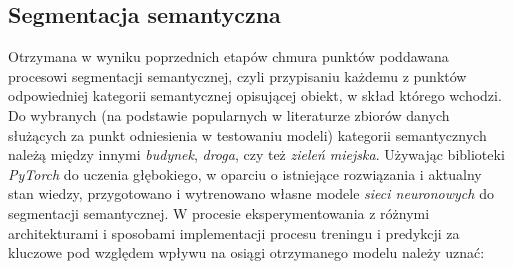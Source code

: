 \subsection{Segmentacja semantyczna}
Otrzymana w wyniku poprzednich etapów chmura punktów poddawana procesowi segmentacji semantycznej, czyli przypisaniu każdemu z punktów odpowiedniej kategorii semantycznej opisującej obiekt, w skład którego wchodzi. Do wybranych (na podstawie popularnych w literaturze zbiorów danych służących za punkt odniesienia w testowaniu modeli) kategorii semantycznych należą między innymi \textit{budynek}, \textit{droga}, czy też \textit{zieleń miejska}. 
Używając biblioteki \textit{PyTorch} do uczenia głębokiego, w oparciu o istniejące rozwiązania i aktualny stan wiedzy, przygotowano i wytrenowano własne modele \emph{sieci neuronowych} do segmentacji semantycznej.
W procesie eksperymentowania z różnymi architekturami i sposobami implementacji procesu treningu i predykcji za kluczowe pod względem wpływu na osiągi otrzymanego modelu należy uznać:
